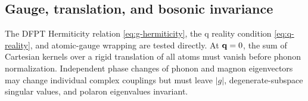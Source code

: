 \subsection{Gauge, translation, and bosonic invariance}

The DFPT Hermiticity relation \cref{eq:g-hermiticity}, the q reality condition \cref{eq:q-reality}, and atomic-gauge wrapping are tested directly. At $\mathbf q=0$, the sum of Cartesian kernels over a rigid translation of all atoms must vanish before phonon normalization. Independent phase changes of phonon and magnon eigenvectors may change individual complex couplings but must leave $|g|$, degenerate-subspace singular values, and polaron eigenvalues invariant.
